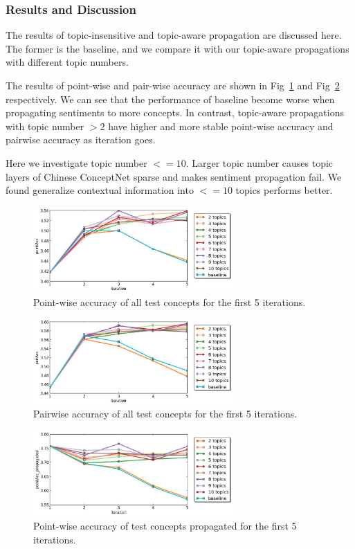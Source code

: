 \subsubsection{Results and Discussion}
The results of topic-insensitive and topic-aware propagation are discussed here. The former is the baseline, and we compare it with our topic-aware propagations with different topic numbers.

The results of point-wise and pair-wise accuracy are shown in Fig~\ref{fig:exp1_iter_pointAcc} and Fig~\ref{fig:exp1_iter_pairAcc} respectively. We can see that the performance of baseline become worse when propagating sentiments to more concepts. In contrast, topic-aware propagations with topic number $>2$ have higher and more stable point-wise accuracy and pairwise accuracy as iteration goes.

Here we investigate topic number $<=10$. Larger topic number causes topic layers of Chinese ConceptNet sparse and makes sentiment propagation fail. We found generalize contextual information into $<=10$ topics performs better.

\begin{figure}[!t]
\centering
\includegraphics[width=3in]{fig/exp1_iterations/pointAcc.jpg}
\caption{Point-wise accuracy of all test concepts for the first 5 iterations.}
\label{fig:exp1_iter_pointAcc}
\end{figure}

\begin{figure}[!t]
\centering
\includegraphics[width=3in]{fig/exp1_iterations/pairAcc.jpg}
\caption{Pairwise accuracy of all test concepts for the first 5 iterations.}
\label{fig:exp1_iter_pairAcc}
\end{figure}

\begin{figure}[!t]
\centering
\includegraphics[width=3in]{fig/exp1_iterations/pointAcc_propagated.jpg}
\caption{Point-wise accuracy of test concepts propagated for the first 5 iterations.}
\label{fig:exp1_iter_pointAcc_known}
\end{figure}

